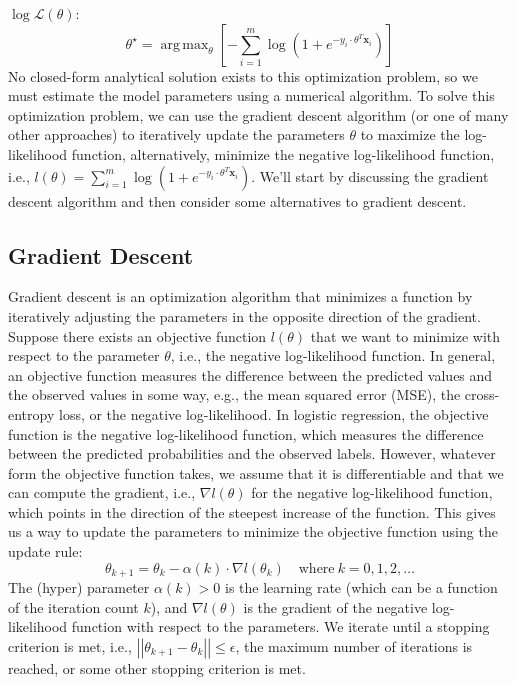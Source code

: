 \documentclass{article}[12pt]
\newcommand{\norm}[1]{\left|\left|#1\right|\right|}
\DeclareMathOperator*{\argmax}{arg\,max}
\begin{document}
$\log\mathcal{L}(\theta)$:
\begin{equation}
\theta^{\star} = \argmax_{\theta}\left[-\sum_{i=1}^{m}\log\left(1 + e^{-y_{i}\cdot\theta^{T}\mathbf{x}_{i}}\right)\right]
\end{equation}
No closed-form analytical solution exists to this optimization problem, so we must estimate the model parameters using a numerical algorithm.
To solve this optimization problem, we can use the gradient descent algorithm (or one of many other approaches) to iteratively update the parameters $\theta$ to maximize the log-likelihood function, 
alternatively, minimize the negative log-likelihood function, i.e., $l(\theta) = \sum_{i=1}^{m}\log\left(1 + e^{-y_{i}\cdot\theta^{T}\mathbf{x}_{i}}\right)$.
We'll start by discussing the gradient descent algorithm and then consider some alternatives to gradient descent.

\subsection{Gradient Descent}
Gradient descent is an optimization algorithm that minimizes a function by iteratively adjusting the parameters in the opposite direction of the gradient.
Suppose there exists an objective function $l(\theta)$ that we want to minimize with respect to the parameter $\theta$, i.e., the negative log-likelihood function.
In general, an objective function measures the difference between the predicted values and the observed values in some way, e.g., the mean squared error (MSE), the cross-entropy loss, or the negative log-likelihood.
In logistic regression, the objective function is the negative log-likelihood function, which measures the difference between the predicted probabilities and the observed labels. However, whatever form the objective function takes, we assume that it is differentiable and that we can compute the gradient, i.e., $\nabla{l}(\theta)$ for the negative log-likelihood function, 
which points in the direction of the steepest increase of the function. This gives us a way to update the parameters to minimize the objective function using the update rule:
\begin{equation*}
\theta_{k+1} = \theta_{k} - \alpha(k)\cdot\nabla{l}(\theta_{k})\quad\text{where}{~k = 0,1,2,\dots}
\end{equation*}
The (hyper) parameter $\alpha(k)>0$ is the learning rate (which can be a function of the iteration count $k$), and $\nabla{l}(\theta)$ is the gradient of the negative log-likelihood function with respect to the parameters.  
We iterate until a stopping criterion is met, i.e., $\norm{\theta_{k+1} - \theta_{k}}\leq\epsilon$, the maximum number of iterations is reached, or some other stopping criterion is met.
\end{document}
